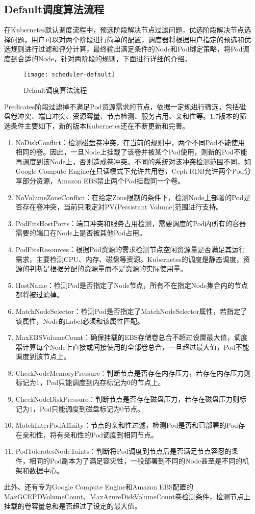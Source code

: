 \subsection{Default调度算法流程}
在Kubernetes默认调度流程中，预选阶段解决节点过滤问题，优选阶段解决节点选择问题。用户可以对两个阶段进行简单的配置，调度器将根据用户指定的预选和优选规则进行过滤和评分计算，最终输出满足条件的Node和Pod绑定策略，将Pod调度到合适的Node，针对两阶段的规则，下面进行详细的介绍。
\begin{figure}[H] %
	\centering
	\texttt{[image: scheduler-default]}
	\caption{Default调度算法流程}
\end{figure}
Predicates阶段过滤掉不满足Pod资源需求的节点，依据一定规进行筛选，包括磁盘卷冲突、端口冲突、资源容量、节点检测、服务占用、亲和性等。1.7版本的筛选条件主要如下，新的版本Kubernetes还在不断更新和完善。
\begin{enumerate}[(1)]
	\item NoDiskConflict：检测磁盘卷冲突，在当前的规则中，两个不同Pod不能使用相同的卷。因此，一旦Node上挂载了该卷并被某个Pod使用，则新的Pod不能再调度到该Node上，否则造成卷冲突。不同的系统对该冲突检测范围不同，如Google Compute Engine在只读模式下允许共用卷，Ceph RDB允许两个Pod分享部分资源，Amazon EBS禁止两个Pod挂载同一个卷。
	\item NoVolumeZoneConflict：在给定Zone限制的条件下，检测Node上部署的Pod是否存在卷冲突，当前只限定对PV(Persistant Volume)范围进行支持。
	\item PodFitsHostPorts：端口冲突和服务占用检测，需要调度的Pod内所有的容器需要的端口在Node上是否被其他Pod占用。
	\item PodFitsResources：根据Pod资源的需求检测节点空闲资源量是否满足其运行需求，主要检测CPU、内存、磁盘等资源。Kubernetes的调度是静态调度，资源的判断是根据分配的资源量而不是资源的实际使用量。
	\item HostName：检测Pod是否指定了Node节点，所有不在指定Node集合内的节点都将被过滤掉。
	\item MatchNodeSelector：检测Pod是否指定了MatchNodeSelector属性，若指定了该属性，Node的Label必须和该属性匹配。
	\item MaxEBSVolumeCount：确保挂载的EBS存储卷总合不超过设置最大值，调度器计算每个Node上直接或间接使用的全部卷总合，一旦超过最大值，Pod不能调度到该节点上。
	\item CheckNodeMemoryPressure：判断节点是否存在内存压力，若存在内存压力则标记为1，Pod只能调度到内存标记为0的节点上。
	\item CheckNodeDiskPressure：判断节点是否存在磁盘压力，若存在磁盘压力则标记为1，Pod只能调度到磁盘标记为0节点。
	\item MatchInterPodAffinity：节点的亲和性过滤，检测Pod是否和已部署的Pod存在亲和性，将有亲和性的Pod调度到相同节点。
	\item PodToleratesNodeTaints：判断将Pod调度到节点后是否满足节点容忍的条件，相同的Pod副本为了满足容灾性，一般部署到不同的Node甚至是不同的机架和数据中心。
\end{enumerate}
此外、还有专为Google Compute Engine和Amazon EBS配置的MaxGCEPDVolumeCount、MaxAzureDiskVolumeCount卷检测条件，检测节点上挂载的卷容量总和是否超过了设定的最大值。

